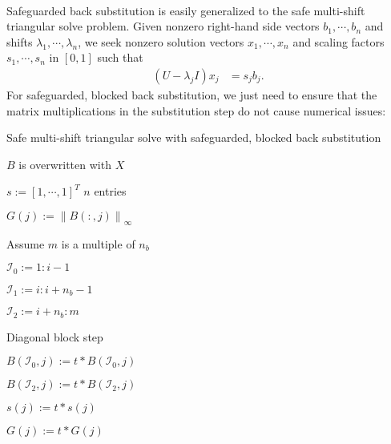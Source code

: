 \documentclass{article}
\begin{document}
\paragraph{} Safeguarded back substitution is easily generalized to
the safe multi-shift triangular solve problem. Given nonzero
right-hand side vectors \(b_1,\cdots,b_n\) and shifts
\(\lambda_1,\cdots,\lambda_n\), we seek nonzero solution vectors
\(x_1,\cdots,x_n\) and scaling factors \(s_1,\cdots,s_n\) in
\(\left[0,1\right]\) such that
\begin{align}
  \left( U - \lambda_j I\right) x_j &= s_j b_j.
\end{align}
For safeguarded, blocked back substitution, we just need to ensure
that the matrix multiplications in the substitution step do not cause
numerical issues:
\begin{algorithm}[H]
  \label{algorithm:safe multi-shift trsm}
  \caption{Safe multi-shift triangular solve with safeguarded, blocked back substitution }
  \begin{algorithmic}
    \Comment \(B\) is overwritten with \(X\)

    \State \(s := \left[1, \cdots, 1 \right]^T\) \Comment \(n\) entries


    \State \( G(j) := \left\lVert B(:,j) \right\rVert_\infty\)

    \EndFor

     \Comment Assume \(m\) is a multiple of
    \(n_b\)

    \State \( \mathcal{I}_0 := 1:i-1 \)

    \State \( \mathcal{I}_1 := i:i+n_b-1\)

    \State \( \mathcal{I}_2 := i+n_b:m\)
    

    \State {} 
    \Comment Diagonal block step


    \State \(B(\mathcal{I}_0,j) := t*B(\mathcal{I}_0,j)\)

    \State \(B(\mathcal{I}_2,j) := t*B(\mathcal{I}_2,j)\)

    \State \(s(j) := t * s(j)\)

    \State \(G(j) := t * G(j)\)

    \EndIf

    \EndFor


\end{algorithmic}
\end{algorithm}
\end{document}
